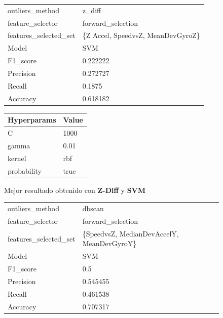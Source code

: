 \begin{appendices}
		\begin{figure}[htb]
			\centering
			\begin{tabular}{ll}
				\toprule
					  outliers\_method &                            z\_diff \\
					 feature\_selector &                 forward\_selection \\
				features\_selected\_set & \{Z Accel, SpeedvsZ, MeanDevGyroZ\} \\
								Model &                               SVM \\
						F1\_score &                          0.222222 \\
					   Precision &                          0.272727 \\
						  Recall &                            0.1875 \\
						Accuracy &                          0.618182 \\
				\bottomrule
			\end{tabular}
			\newline
			\newline

			\begin{tabular}{ll}
				\toprule
				Hyperparams & Value \\
				\midrule
						  C &  1000 \\
					  gamma &  0.01 \\
					 kernel &   rbf \\
				probability &  true \\
				\bottomrule
			\end{tabular}
			\caption{Mejor resultado obtenido con \textbf{Z-Diff} y \textbf{SVM}}
			\label{table:18}
		\end{figure}

		\begin{figure}[htb]
			\centering
			\begin{tabular}{ll}
				\toprule
					  outliers\_method &                                    dbscan \\
					 feature\_selector &                         forward\_selection \\
				features\_selected\_set & \{SpeedvsZ, MedianDevAccelY, MeanDevGyroY\} \\
								Model &                                       SVM \\
						F1\_score &                                       0.5 \\
					   Precision &                                  0.545455 \\
						  Recall &                                  0.461538 \\
						Accuracy &                                  0.707317 \\
				\bottomrule
			\end{tabular}
			\newline
			\newline


\end{figure}
\end{appendices}
